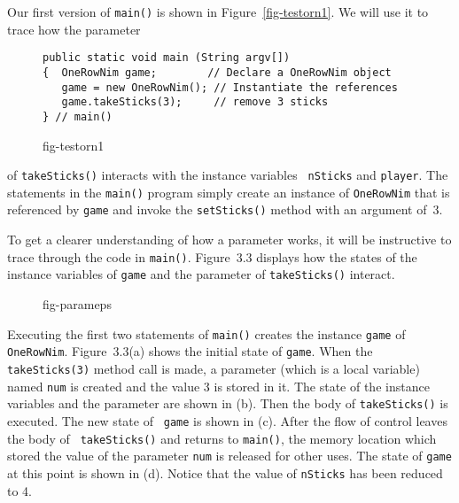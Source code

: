 Our first version of {\tt main()} is shown in
Figure~\ref{fig-testorn1}.  We will use it to trace how the parameter
\begin{figure}[h!]
\jjjprogstart
\begin{jjjlisting}
\begin{lstlisting}
public static void main (String argv[])
{  OneRowNim game;        // Declare a OneRowNim object
   game = new OneRowNim(); // Instantiate the references
   game.takeSticks(3);     // remove 3 sticks
} // main()
\end{lstlisting}
\end{jjjlisting}
{fig-testorn1}
\end{figure}
of {\tt takeSticks()} interacts with the instance variables {\tt
nSticks} and {\tt player}.  The statements in the {\tt main()} program
simply create an instance of {\tt OneRowNim} that is referenced by
{\tt game} and invoke the {\tt setSticks()} method with an argument
of~3.

To get a clearer understanding of how a parameter works, it will be
instructive to trace through the code in {\tt main()}.  Figure~3.3
displays how the states of the instance variables of {\tt game} and
the parameter of {\tt takeSticks()} interact.

\begin{figure}[tb]
{fig-parameps}
\end{figure}

Executing the first two statements of {\tt main()} creates the
instance {\tt game} of {\tt OneRowNim}. Figure~3.3(a)
shows the initial state of {\tt game}. When the {\tt takeSticks(3)}
method call is made, a parameter (which is a local variable) named
{\tt num} is created and the value 3 is stored in it.  The state of
the instance variables and the parameter are shown in (b). Then the
body of {\tt takeSticks()} is executed. The new state of {\tt
game} is shown in (c). After the flow of control leaves the body of {\tt
takeSticks()} and returns to {\tt main()}, the memory location which
stored the value of the parameter {\tt num} is released for other
uses. The state of {\tt game} at this point is shown in (d). Notice
that the value of {\tt nSticks} has been reduced to 4.

